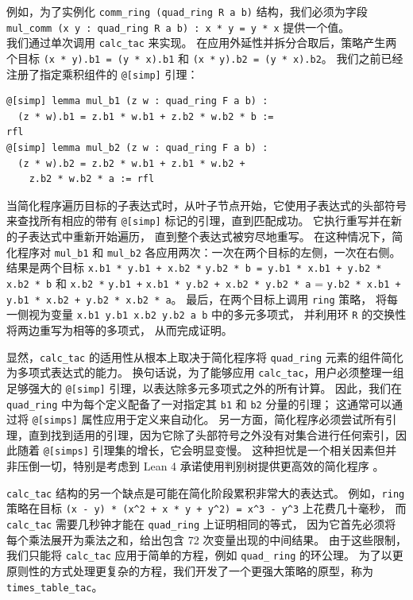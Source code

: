 \documentclass[sigplan,10pt,nonacm,
screen]{acmart} \settopmatter{printfolios=true,printccs=false,printacmref=false}
\begin{document}
例如，为了实例化 \lstinline{comm_ring (quad_ring R a b)} 结构，我们必须为字段 \lstinline{mul_comm (x y : quad_ring R a b) : x * y = y * x} 提供一个值。\\
我们通过单次调用 \lstinline{calc_tac} 来实现。
在应用外延性并拆分合取后，策略产生两个目标 \lstinline{(x * y).b1 = (y * x).b1} 和 \lstinline{(x *} \lstinline{y).b2 = (y * x).b2}。 %
我们之前已经注册了指定乘积组件的 \lstinline{@[simp]} 引理：
\begin{lstlisting}
@[simp] lemma mul_b1 (z w : quad_ring F a b) :
  (z * w).b1 = z.b1 * w.b1 + z.b2 * w.b2 * b :=
rfl
@[simp] lemma mul_b2 (z w : quad_ring F a b) :
  (z * w).b2 = z.b2 * w.b1 + z.b1 * w.b2 +
    z.b2 * w.b2 * a := rfl
\end{lstlisting}
当简化程序遍历目标的子表达式时，从叶子节点开始，它使用子表达式的头部符号来查找所有相应的带有 \lstinline{@[simp]} 标记的引理，直到匹配成功。
它执行重写并在新的子表达式中重新开始遍历，
直到整个表达式被穷尽地重写。
在这种情况下，简化程序对 \lstinline{mul_b1} 和 \lstinline{mul_b2} 各应用两次：一次在两个目标的左侧，一次在右侧。
结果是两个目标 \lstinline{x.b1 * y.b1 + x.b2 *} %
\lstinline{y.b2 * b = y.b1 * x.b1 + y.b2 * x.b2 * b} 和 \lstinline{x.b2 *} \lstinline{y.b1 +} %
\lstinline{x.b1 * y.b2 + x.b2 * y.b2 * a} = \lstinline{y.b2 * x.b1 + y.b1 * x.b2 + y.b2 * x.b2 * a}。
最后，在两个目标上调用 \lstinline{ring} 策略，
将每一侧视为变量 \lstinline{x.b1 y.b1 x.b2 y.b2 a b} 中的多元多项式，
并利用环 \lstinline{R} 的交换性将两边重写为相等的多项式，
从而完成证明。

显然，\lstinline{calc_tac} 的适用性从根本上取决于简化程序将 \lstinline{quad_ring} 元素的组件简化为多项式表达式的能力。
换句话说，为了能够应用 \lstinline{calc_tac}，用户必须整理一组足够强大的 \lstinline{@[simp]} 引理，以表达除多元多项式之外的所有计算。
因此，我们在 \lstinline{quad_ring} 中为每个定义配备了一对指定其 \lstinline{b1} 和 \lstinline{b2} 分量的引理；
这通常可以通过将 \lstinline{@[simps]} 属性应用于定义来自动化。
另一方面，简化程序必须尝试所有引理，直到找到适用的引理，因为它除了头部符号之外没有对集合进行任何索引，因此随着 \lstinline{@[simps]} 引理集的增长，它会明显变慢。
这种担忧是一个相关因素但并非压倒一切，特别是考虑到 Lean 4 承诺使用判别树提供更高效的简化程序 \cite{lean-4}。

\lstinline{calc_tac} 结构的另一个缺点是可能在简化阶段累积非常大的表达式。
例如，\lstinline{ring} 策略在目标 \lstinline{(x - y) * (x^2 + x * y + y^2) = x^3 - y^3} 上花费几十毫秒，
而 \lstinline{calc_tac} 需要几秒钟才能在 \lstinline{quad_ring} 上证明相同的等式，
因为它首先必须将每个乘法展开为乘法之和，给出包含 72 次变量出现的中间结果。
由于这些限制，我们只能将 \lstinline{calc_tac} 应用于简单的方程，例如 \lstinline{quad_}\- %
\lstinline{ring} 的环公理。
为了以更原则性的方式处理更复杂的方程，我们开发了一个更强大策略的原型，称为 \lstinline{times_table_tac}。
\end{document}
